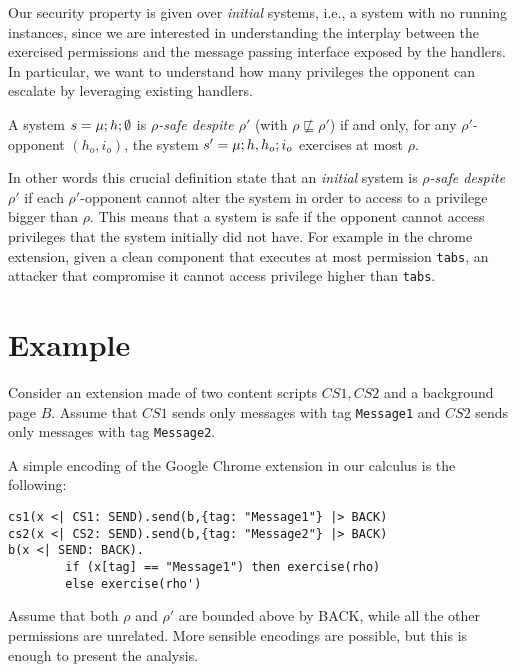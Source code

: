 Our security property is given over \emph{initial} systems, i.e., a system with no running instances, since we are interested in understanding the interplay between the exercised permissions and the message passing interface exposed by the handlers. In particular, we want to understand how many privileges the opponent can escalate by leveraging existing handlers.

\begin{definition}
\label{def:safety}
A system $s = \mu;h;\emptyset$ is \emph{$\rho$-safe despite $\rho'$} (with $\rho \not\sqsubseteq \rho'$) if and only, for any $\rho'$-opponent $(h_o,i_o)$, the system $s' = \mu;h,h_o;i_o$ exercises at most $\rho$.
\end{definition}
In other words this crucial definition state that an \emph{initial} system is \emph{$\rho$-safe despite $\rho'$} if each $\rho'$-opponent cannot alter the system in order to access to a privilege bigger than $\rho$. This means that a system is safe if the opponent cannot access privileges that the system initially did not have. For example in the chrome extension, given a clean component that executes at most permission \texttt{tabs}, an attacker that compromise it cannot access privilege higher than \texttt{tabs}.

\section{Example}
\label{sec:Example}
Consider an extension made of two content scripts $CS1,CS2$ and a background page $B$. Assume that $CS1$ sends only messages with tag \texttt{Message1} and $CS2$ sends only messages with tag \texttt{Message2}.

A simple encoding of the Google Chrome extension in our calculus is the following:
\begin{verbatim}
cs1(x <| CS1: SEND).send(b,{tag: "Message1"} |> BACK)
cs2(x <| CS2: SEND).send(b,{tag: "Message2"} |> BACK)
b(x <| SEND: BACK).
        if (x[tag] == "Message1") then exercise(rho) 
        else exercise(rho')
\end{verbatim}
Assume that both $\rho$ and $\rho'$ are bounded above by BACK, while all the other permissions are unrelated. More sensible encodings are possible, but this is enough to present the analysis.

